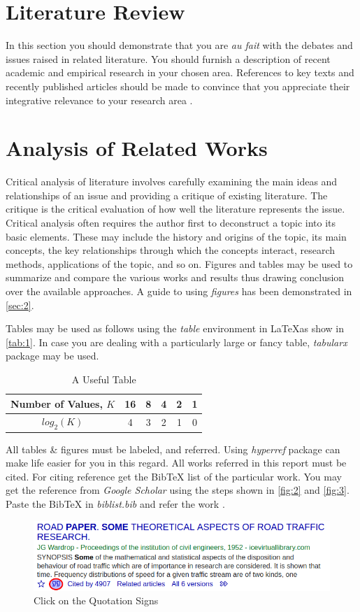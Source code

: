 \documentclass[hidelinks,14pt]{extarticle}
\begin{document}
\section{Literature Review}
\label{sec:3}
In this section you should demonstrate that you are \textit{au fait} with the debates and issues raised in related literature. You should furnish a description of recent academic and empirical research in your chosen area. References to key texts and recently published articles should be made to convince that you appreciate their integrative relevance to your research area .

\section{Analysis of Related Works}
\label{sec:4}
Critical analysis of literature involves carefully examining the main ideas and relationships of an issue and providing a critique of existing literature. The critique is the critical evaluation of how well the literature represents the issue. Critical analysis often requires the author first to deconstruct a topic into its basic elements. These may include the history and origins of
the topic, its main concepts, the key relationships through which the concepts interact, research methods, applications of the topic, and so on. Figures and tables may be used to summarize and compare the various works and results thus drawing conclusion over the available approaches. A guide to using \emph{figures} has been demonstrated in \autoref{sec:2}.

Tables may be used as follows using the \emph{table} environment in \LaTeX as show in \autoref{tab:1}. In case you are dealing with a particularly large or fancy table, \emph{tabularx} package may be used.
\begin{table}
\centering
\caption{A Useful Table}
\label{tab:1}
\begin{tabular}{|c|c|c|c|c|c|}
\hline
Number of Values, $K$ & 16 & 8 & 4 & 2 & 1 \\ \hline
$log_2(K)$             & 4  & 3 & 2 & 1 & 0 \\ \hline
\end{tabular}
\end{table}
All tables \& figures must be labeled, and referred. Using \emph{hyperref} package can make life easier for you in this regard. 
All works referred in this report must be cited. For citing reference get the BibTeX list of the particular work. You may get the reference from \emph{Google Scholar} using the steps shown in \autoref{fig:2} and \autoref{fig:3}. Paste the BibTeX in \emph{biblist.bib} and refer the work \cite{lester1999writing}.
\begin{figure}[htbp]
\centerline{\includegraphics[width=0.7\linewidth]{fig/Selection_028.png}}
\caption{Click on the Quotation Signs}
\label{fig:2}
\end{figure}
\end{document}
